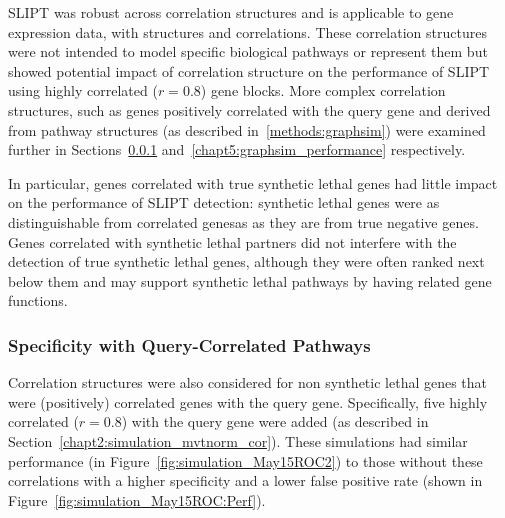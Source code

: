 \gls{SLIPT} was robust across correlation structures and is applicable to gene expression data, with  structures and correlations. These correlation structures were not intended to model specific biological pathways or represent them but showed potential impact of correlation structure on the performance of \gls{SLIPT} using highly correlated ($r = 0.8$) gene blocks. More complex correlation structures, such as genes positively correlated with the query gene and derived from pathway  structures (as described in~\ref{methods:graphsim}) were examined further in Sections~\ref{chapt2:simulation_mvtnorm_query_cor} and~\ref{chapt5:graphsim_performance} respectively.

In particular, genes correlated with true \gls{synthetic lethal} genes had little impact on the performance of \gls{SLIPT} detection: \gls{synthetic lethal} genes were as distinguishable from correlated genesas as they are from true negative genes. Genes correlated with \gls{synthetic lethal} partners did not interfere with the detection of true \gls{synthetic lethal} genes, although they were often ranked next below them and may support \gls{synthetic lethal} pathways by having related gene functions.


\subsubsection{Specificity with Query-Correlated Pathways}  \label{chapt2:simulation_mvtnorm_query_cor}

Correlation structures were also considered for non synthetic lethal genes that were (positively) correlated genes with the query gene. Specifically, five highly correlated ($r = 0.8$) with the query gene were added (as described in Section~\ref{chapt2:simulation_mvtnorm_cor}). These simulations had similar performance (in Figure~\ref{fig:simulation_May15ROC2}) to those without these correlations with a higher specificity and a lower false positive rate (shown in Figure~\ref{fig:simulation_May15ROC:Perf}).


